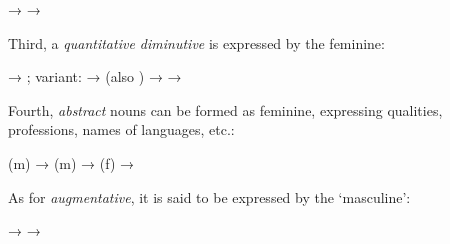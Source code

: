 \begin{exe}
  \ex\label{ex:fassi:53}
  \begin{xlist}
    \ex\label{ex:fassi:53a}  → 
    \ex\label{ex:fassi:53b}  → 
  \end{xlist}
\end{exe}
%
Third, a \emph{quantitative diminutive} is expressed by the feminine:


\begin{exe}
  \ex\label{ex:fassi:54}
  \begin{xlist}
    \ex\label{ex:fassi:54a}  → ; variant:  → 
    \ex\label{ex:fassi:54b}  (also )
    \ex\label{ex:fassi:54c}  \citep{Kossmann2014,Grandi2015}
    \ex\label{ex:fassi:54d}  → 
    \ex\label{ex:fassi:54e}  →  \citep{Kossmann2014}
  \end{xlist}
\end{exe}
%
Fourth, \textit{abstract} nouns can be formed as feminine, expressing
qualities, professions, names of languages, etc.:

\begin{exe}
  \ex\label{ex:fassi:55}
  \begin{xlist}
    \ex\label{ex:fassi:55a}  (m)  → 
    \ex\label{ex:fassi:55b}  (m)  →  (f) 
    \ex\label{ex:fassi:55c}  →  \citep{Kossmann2014}
  \end{xlist}
\end{exe}
% 
As for \textit{augmentative}, it is said to be expressed by the `masculine':

\begin{exe}
  \ex\label{ex:fassi:56}
  \begin{xlist}
    \ex\label{ex:fassi:56a}  → 
    \ex\label{ex:fassi:56b}  →  \citep{Kossmann2014}
    \ex\label{ex:fassi:56c} 
  \end{xlist}
\end{exe}

